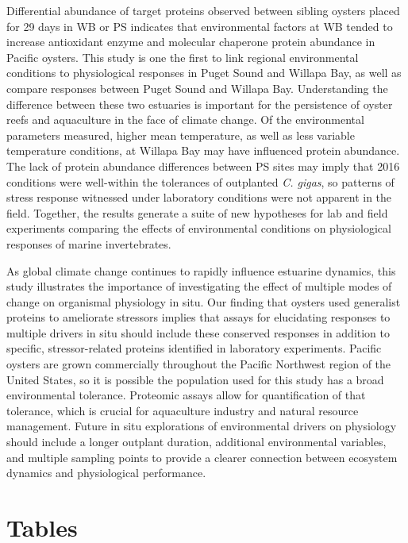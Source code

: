 \documentclass [11pt, proquest] {uwthesis}[2015/03/03]
\begin{document}
Differential abundance of target proteins observed between sibling oysters placed for 29 days in WB or PS indicates that environmental factors at WB tended to increase antioxidant enzyme and molecular chaperone protein abundance in Pacific oysters. This study is one the first to link regional environmental conditions to physiological responses in Puget Sound and Willapa Bay, as well as compare responses between Puget Sound and Willapa Bay. Understanding the difference between these two estuaries is important for the persistence of oyster reefs and aquaculture in the face of climate change. Of the environmental parameters measured, higher mean temperature, as well as less variable temperature conditions, at Willapa Bay may have influenced protein abundance. The lack of protein abundance differences between PS sites may imply that 2016 conditions were well-within the tolerances of outplanted \emph{C. gigas}, so patterns of stress response witnessed under laboratory conditions were not apparent in the field. Together, the results generate a suite of new hypotheses for lab and field experiments comparing the effects of environmental conditions on physiological responses of marine invertebrates.

As global climate change continues to rapidly influence estuarine dynamics, this study illustrates the importance of investigating the effect of multiple modes of change on organismal physiology in situ. Our finding that oysters used generalist proteins to ameliorate stressors implies that assays for elucidating responses to multiple drivers in situ should include these conserved responses in addition to specific, stressor-related proteins identified in laboratory experiments. Pacific oysters are grown commercially throughout the Pacific Northwest region of the United States, so it is possible the population used for this study has a broad environmental tolerance. Proteomic assays allow for quantification of that tolerance, which is crucial for aquaculture industry and natural resource management. Future in situ explorations of environmental drivers on physiology should include a longer outplant duration, additional environmental variables, and multiple sampling points to provide a clearer connection between ecosystem dynamics and physiological performance.

\clearpage

\hypertarget{tables}{%
\section{Tables}\label{tables}}
\end{document}
